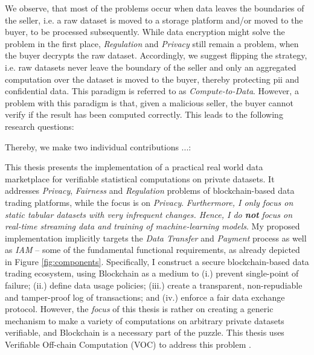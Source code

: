 \noindent We observe, that most of the problems occur when data leaves the boundaries of the seller, i.e. a raw dataset is moved to a storage platform and/or moved to the buyer, to be processed subsequently. While data encryption might solve the problem in the first place, \emph{Regulation} and \emph{Privacy} still remain a problem, when the buyer decrypts the raw dataset. Accordingly, we suggest flipping the strategy, i.e. raw datasets never leave the boundary of the seller and only an aggregated computation over the dataset is moved to the buyer, thereby protecting \acrshort{pii} and confidential data. This paradigm is referred to as \emph{Compute-to-Data}. However, a problem with this paradigm is that, given a malicious seller, the buyer cannot verify if the result has been computed correctly. This leads to the following research questions:


Thereby, we make two individual contributions ...:

This thesis presents the implementation of a practical real world data marketplace for verifiable statistical computations on private datasets. It addresses \emph{Privacy}, \emph{Fairness} and \emph{Regulation} problems of blockchain-based data trading platforms, while the focus is on \emph{Privacy}. \emph{Furthermore, I only focus on static tabular datasets with very infrequent changes. Hence, I do \textbf{not} focus on real-time streaming data and training of machine-learning models}. My proposed implementation implicitly targets the \emph{Data Transfer} and \emph{Payment} process as well as \emph{IAM} -- some of the fundamental functional requirements, as already depicted in Figure \ref{fig:components}. Specifically, I construct a secure blockchain-based data trading ecosystem, using Blockchain as a medium to (i.) prevent single-point of failure; (ii.) define data usage policies; (iii.) create a transparent, non-repudiable and tamper-proof log of transactions; and (iv.) enforce a fair data exchange protocol. However, the \emph{focus} of this thesis is rather on creating a generic mechanism to make a variety of computations on arbitrary private datasets verifiable, and Blockchain is a necessary part of the puzzle. This thesis uses Verifiable Off-chain Computation (VOC) to address this problem \cite{eberhardtOffchainingModelsApproaches2018,eberhardtBlockchainInsightsOffChaining2017}.

